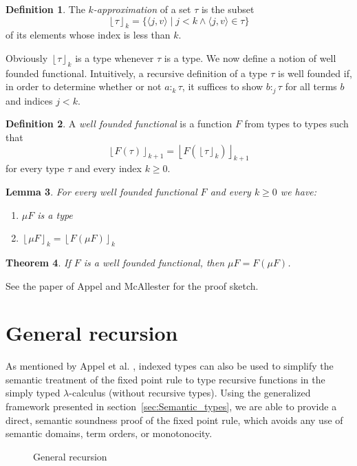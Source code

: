 \documentclass[10pt,a4paper,final,twocolumn]{article}
\theoremstyle{definition}
\newtheorem{definition}{Definition}
\theoremstyle{plain}
\newtheorem{lemma}[definition]{Lemma}
\newtheorem{theorem}[definition]{Theorem}
\newcommand{\app}[2]{\ensuremath{{#1}\,{#2}}}
\newcommand{\fix}[1]{\ensuremath{\mathsf{fix}\,{#1}}}
\newcommand{\pair}[1]{\ensuremath{\langle{#1}\rangle}}
\newcommand{\floor}[1]{\ensuremath{\left\lfloor{#1}\right\rfloor}}
\begin{document}
\begin{definition} \label{def:Approximation}
  The \emph{$k$-approximation} of a set $\tau$ is the subset
  \[ \floor{\tau}_k = \{ \pair{j,v} \mid j < k \wedge \pair{j,v} \in \tau \} \]
  of its elements whose index is less than $k$.
\end{definition}

Obviously $\floor{\tau}_k$ is a type whenever $\tau$ is a type. We now define a notion of well founded
functional. Intuitively, a recursive definition of a type $\tau$ is well founded if, in order to determine
whether or not $a :_k \tau$, it suffices to show $b :_j \tau$ for all terms $b$ and indices $j < k$.

\begin{definition}
  A \emph{well founded functional} is a function $F$ from types to types such that
  \[\floor{F\left(\tau\right)}_{k+1} = \floor{F\left(\floor{\tau}_k\right)}_{k+1}\]
  for every type $\tau$ and every index $k \ge 0$.
\end{definition}

\begin{lemma}
  For every well founded functional $F$ and every $k \ge 0$ we have:
  \begin{enumerate}
  \item $\mu F$ is a type
  \item $\floor{\mu F}_k = \floor{F \left(\mu F\right)}_k$
  \end{enumerate}
\end{lemma}

\begin{theorem} \label{thm:Well_founded_fixpoint}
  If $F$ is a well founded functional, then $\mu F = F(\mu F)$.
\end{theorem}

See the paper of Appel and McAllester \cite{Appel01} for the proof sketch.


\section{General recursion}
\label{sec:General_recursion}


As mentioned by Appel et al. \cite{Appel01}, indexed types can also be used to simplify the semantic treatment of the
fixed point rule to type recursive functions in the simply typed $\lambda$-calculus (without recursive types). Using the
generalized framework presented in section~\ref{sec:Semantic_types}, we are able to provide a direct, semantic
soundness proof of the fixed point rule, which avoids any use of semantic domains, term orders, or monotonocity.
\begin{figure}[tbh]
  \centering
  \caption{General recursion}
  \label{fig:General_recursion}
\end{figure}
\end{document}
